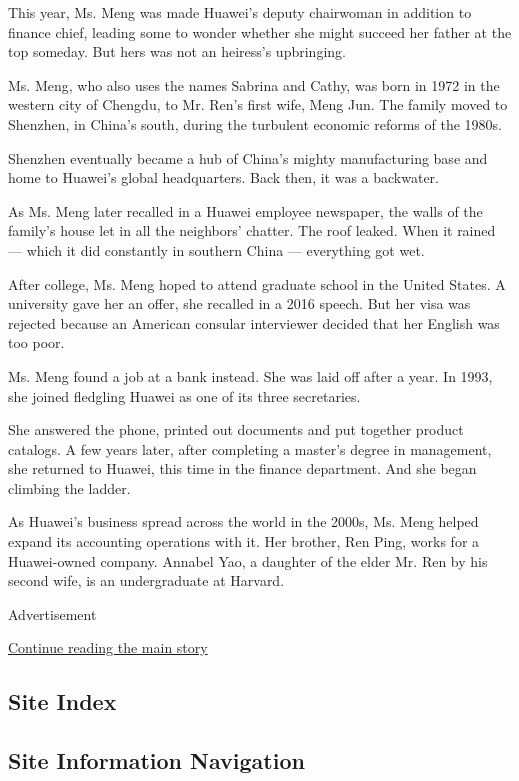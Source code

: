 This year, Ms. Meng was made Huawei's deputy chairwoman in addition to
finance chief, leading some to wonder whether she might succeed her
father at the top someday. But hers was not an heiress's upbringing.

Ms. Meng, who also uses the names Sabrina and Cathy, was born in 1972 in
the western city of Chengdu, to Mr. Ren's first wife, Meng Jun. The
family moved to Shenzhen, in China's south, during the turbulent
economic reforms of the 1980s.

Shenzhen eventually became a hub of China's mighty manufacturing base
and home to Huawei's global headquarters. Back then, it was a backwater.

As Ms. Meng later recalled in a Huawei employee newspaper, the walls of
the family's house let in all the neighbors' chatter. The roof leaked.
When it rained --- which it did constantly in southern China ---
everything got wet.

After college, Ms. Meng hoped to attend graduate school in the United
States. A university gave her an offer, she recalled in a 2016 speech.
But her visa was rejected because an American consular interviewer
decided that her English was too poor.

Ms. Meng found a job at a bank instead. She was laid off after a year.
In 1993, she joined fledgling Huawei as one of its three secretaries.

She answered the phone, printed out documents and put together product
catalogs. A few years later, after completing a master's degree in
management, she returned to Huawei, this time in the finance department.
And she began climbing the ladder.

As Huawei's business spread across the world in the 2000s, Ms. Meng
helped expand its accounting operations with it. Her brother, Ren Ping,
works for a Huawei-owned company. Annabel Yao, a daughter of the elder
Mr. Ren by his second wife, is an undergraduate at Harvard.

Advertisement

\protect\hyperlink{after-bottom}{Continue reading the main story}

\hypertarget{site-index}{%
\subsection{Site Index}\label{site-index}}

\hypertarget{site-information-navigation}{%
\subsection{Site Information
Navigation}\label{site-information-navigation}}


